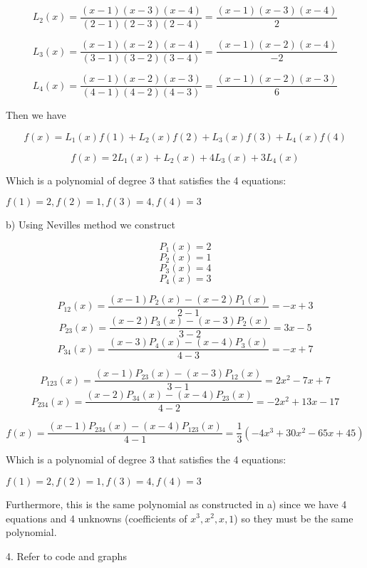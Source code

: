 \documentclass{article}
\begin{document}
$$L_2(x) = \frac{(x-1)(x-3)(x-4)}{(2-1)(2-3)(2-4)} =  \frac{(x-1)(x-3)(x-4)}{2} $$

$$L_3(x) = \frac{(x-1)(x-2)(x-4)}{(3-1)(3-2)(3-4)} =  \frac{(x-1)(x-2)(x-4)}{-2} $$

$$L_4(x) = \frac{(x-1)(x-2)(x-3)}{(4-1)(4-2)(4-3)} = \frac{(x-1)(x-2)(x-3)}{6}$$

Then we have 

$$f(x) = L_1(x)f(1) + L_2(x)f(2) + L_3(x)f(3) + L_4(x)f(4) $$

$$f(x) = 2L_1(x) + L_2(x) + 4L_3(x) +3 L_4(x) $$

Which is a polynomial of degree 3 that satisfies the 4 equations: 

$f(1) = 2, f(2) = 1, f(3) = 4, f(4) = 3$ 

b)
Using Nevilles method we construct 

$$P_1(x) = 2$$
$$P_2(x) = 1$$
$$P_3(x) = 4$$
$$P_4(x) = 3$$

$$P_{12}(x) = \frac{(x-1)P_2(x) - (x-2)P_1(x)}{2-1} =  -x+3 $$
$$P_{23}(x) =  \frac{(x-2)P_3(x) - (x-3)P_2(x)}{3-2} =  3x-5 $$
$$P_{34}(x) =  \frac{(x-3)P_4(x) - (x-4)P_3(x)}{4-3} =  -x+7$$

$$P_{123}(x) = \frac{ (x-1)P_{23}(x) - (x-3)P_{12}(x)}{3-1} =  2x^2-7x+7$$
$$P_{234}(x) =  \frac{  (x-2)P_{34}(x) - (x-4)P_{23}(x)}{4-2} =  -2x^2+13x-17 $$


$$f(x) = \frac{(x-1)P_{234}(x) - (x-4)P_{123}(x) }{4-1} = \frac{1}{3} (-4x^3 +30x^2 -65x+ 45)  $$

Which is a polynomial of degree 3 that satisfies the 4 equations: 

$f(1) = 2, f(2) = 1, f(3) = 4, f(4) = 3$ 

Furthermore, this is the same polynomial as constructed in a) since we have 4 equations and 4 unknowns (coefficients of $x^3, x^2, x, 1$) so they must be the same polynomial.
 
 
 4. Refer to code and graphs
\end{document}
